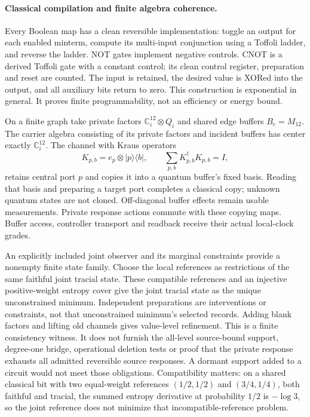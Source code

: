 \paragraph{Classical compilation and finite algebra coherence.}
Every Boolean map has a clean reversible implementation: toggle an output
for each enabled minterm, compute its multi-input conjunction using a
Toffoli ladder, and reverse the ladder. NOT gates implement negative
controls. CNOT is a derived Toffoli gate with a constant control; its clean
control register, preparation and reset are counted. The input is retained, the desired value is XORed into the output,
and all auxiliary bits return to zero. This construction is exponential in
general. It proves finite programmability, not an efficiency or energy bound.

On a finite graph take private factors $\mathbb C^{12}_i\otimes Q_i$ and
shared edge buffers $B_e=M_{12}$. The carrier algebra consisting of its
private factors and incident buffers has center exactly $\mathbb C^{12}_i$.
The channel with Kraus operators
\[
 K_{p,b}=e_p\otimes|p\rangle\langle b|,
 \qquad \sum_{p,b}K_{p,b}^{\dagger}K_{p,b}=I,
\]
retains central port $p$ and copies it into a quantum buffer's fixed basis.
Reading that basis and preparing a target port completes a classical copy;
unknown quantum states are not cloned. Off-diagonal buffer effects remain
usable measurements. Private response actions commute with these copying
maps. Buffer access, controller transport and readback receive their actual
local-clock grades.

An explicitly included joint observer and its marginal constraints provide
a nonempty finite state family. Choose the local references as restrictions
of the same faithful joint tracial state. These compatible references and an injective
positive-weight entropy cover give the joint tracial state as the unique
unconstrained minimum. Independent preparations are interventions or
constraints, not that unconstrained minimum's selected records. Adding blank
factors and lifting old channels gives value-level refinement. This is a
finite consistency witness. It does not furnish the all-level source-bound
support, degree-one bridge, operational deletion tests or proof that the
private response exhausts all admitted reversible source responses. A
dormant support added to a circuit would not meet those obligations.
Compatibility matters: on a shared classical bit with two equal-weight
references $(1/2,1/2)$ and $(3/4,1/4)$, both faithful and tracial, the summed
entropy derivative at probability $1/2$ is $-\log3$, so the joint reference
does not minimize that incompatible-reference problem.

